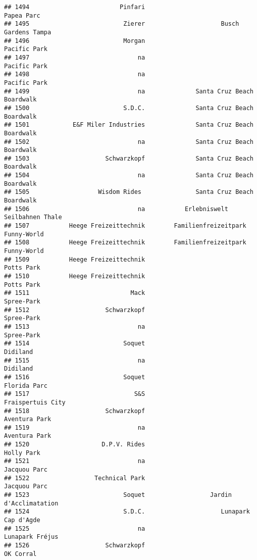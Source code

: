 \documentclass[
]{article}
\begin{document}
\begin{verbatim}
## 1494                         Pinfari                              Papea Parc
## 1495                          Zierer                     Busch Gardens Tampa
## 1496                          Morgan                            Pacific Park
## 1497                              na                            Pacific Park
## 1498                              na                            Pacific Park
## 1499                              na              Santa Cruz Beach Boardwalk
## 1500                          S.D.C.              Santa Cruz Beach Boardwalk
## 1501            E&F Miler Industries              Santa Cruz Beach Boardwalk
## 1502                              na              Santa Cruz Beach Boardwalk
## 1503                     Schwarzkopf              Santa Cruz Beach Boardwalk
## 1504                              na              Santa Cruz Beach Boardwalk
## 1505                   Wisdom Rides               Santa Cruz Beach Boardwalk
## 1506                              na           Erlebniswelt Seilbahnen Thale
## 1507           Heege Freizeittechnik        Familienfreizeitpark Funny-World
## 1508           Heege Freizeittechnik        Familienfreizeitpark Funny-World
## 1509           Heege Freizeittechnik                              Potts Park
## 1510           Heege Freizeittechnik                              Potts Park
## 1511                            Mack                              Spree-Park
## 1512                     Schwarzkopf                              Spree-Park
## 1513                              na                              Spree-Park
## 1514                          Soquet                                Didiland
## 1515                              na                                Didiland
## 1516                          Soquet                            Florida Parc
## 1517                             S&S                       Fraispertuis City
## 1518                     Schwarzkopf                           Aventura Park
## 1519                              na                           Aventura Park
## 1520                    D.P.V. Rides                              Holly Park
## 1521                              na                            Jacquou Parc
## 1522                  Technical Park                            Jacquou Parc
## 1523                          Soquet                  Jardin d'Acclimatation
## 1524                          S.D.C.                     Lunapark Cap d'Agde
## 1525                              na                         Lunapark Fréjus
## 1526                     Schwarzkopf                               OK Corral

\end{verbatim}
\end{document}
